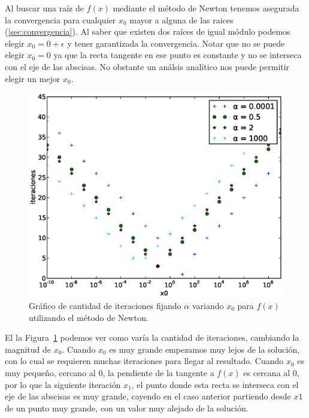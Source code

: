 Al buscar una raíz de $f(x)$ mediante el método de Newton tenemos asegurada la
convergencia para cualquier $x_0$ mayor a alguna de las raices
(\ref{sec:convergencia}). Al saber que existen dos raíces de igual módulo
podemos elegir $x_0 = 0 + \epsilon$ y tener garantizada la convergencia. Notar
que no se puede elegir $x_0 = 0$ ya que la recta tangente en ese punto es
constante y no se interseca con el eje de las abscisas. No obstante un análsis
analítico nos puede permitir elegir un mejor $x_0$.

\begin{figure}[!htbp]
  \begin{center}
    \includegraphics[scale=0.5]{graficos/new/f_newton_x0_variable.eps}
    \caption{\label{fig:f_newton_x0_variable} Gráfico de cantidad de iteraciones fijando $\alpha$ variando $x_0$ para $f(x)$ utilizando el método de Newton.}
  \end{center}
\end{figure}

El la Figura~\ref{fig:f_newton_x0_variable}  podemos ver como varía la cantidad
de iteraciones, cambiando la magnitud de $x_0$. Cuando $x_0$ es muy grande
empezamos muy lejos de la solución, con lo cual se requieren muchas iteraciones
para llegar al resultado.
Cuando $x_0$ es muy pequeño, cercano al $0$, la pendiente de la tangente a
$f(x)$ es cercana al 0, por lo que la siguiente iteración $x_1$, el punto donde
esta recta se interseca con el eje de las abscisas es muy grande, cayendo en el
caso anterior partiendo desde $x1$ de un punto muy grande, con un valor muy
alejado de la solución.

